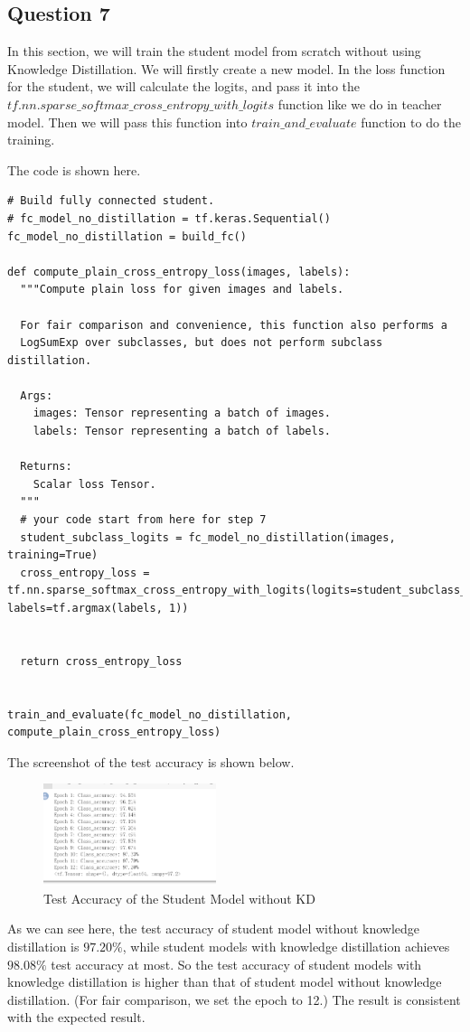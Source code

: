 \documentclass[conference]{IEEEtran}
\begin{document}
\subsection{Question 7}
In this section, we will train the student model from scratch without using Knowledge Distillation.
We will firstly create a new model. In the loss function for the student, we will calculate the logits, and pass it into the $tf.nn.sparse\_softmax\_cross\_entropy\_with\_logits$ function like we do in teacher model.
Then we will pass this function into $train\_and\_evaluate$ function to do the training.\par
The code is shown here.
\begin{lstlisting}
# Build fully connected student.
# fc_model_no_distillation = tf.keras.Sequential()
fc_model_no_distillation = build_fc()

def compute_plain_cross_entropy_loss(images, labels):
  """Compute plain loss for given images and labels.

  For fair comparison and convenience, this function also performs a
  LogSumExp over subclasses, but does not perform subclass distillation.

  Args:
    images: Tensor representing a batch of images.
    labels: Tensor representing a batch of labels.

  Returns:
    Scalar loss Tensor.
  """
  # your code start from here for step 7
  student_subclass_logits = fc_model_no_distillation(images, training=True)
  cross_entropy_loss = tf.nn.sparse_softmax_cross_entropy_with_logits(logits=student_subclass_logits, labels=tf.argmax(labels, 1))

  
  return cross_entropy_loss


train_and_evaluate(fc_model_no_distillation, compute_plain_cross_entropy_loss)
\end{lstlisting}
The screenshot of the test accuracy is shown below.

\begin{figure}[h] 
    \centering
    \includegraphics[width=0.45\textwidth]{./graphs/T1Q7_train.png}
    \caption{Test Accuracy of the Student Model without KD}
    \label{Fig.t1q3e}
\end{figure}
As we can see here, the test accuracy of student model without knowledge distillation is $97.20\%$, while student models with knowledge distillation achieves $98.08\%$ test accuracy at most.
So the test accuracy of student models with knowledge distillation is higher than that of student model without knowledge distillation. (For fair comparison, we set the epoch to 12.) The result is consistent with the expected result.
\end{document}
